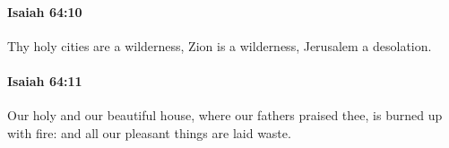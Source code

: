 		\paragraph{Isaiah 64:10} %
			\label{ISAIAH-64-10}

			Thy holy cities are a wilderness, Zion is a wilderness, Jerusalem a desolation.


		\paragraph{Isaiah 64:11} %
			\label{ISAIAH-64-11}

			Our holy and our beautiful house, where our fathers praised thee, is burned up with fire: and all our pleasant things are laid waste.


